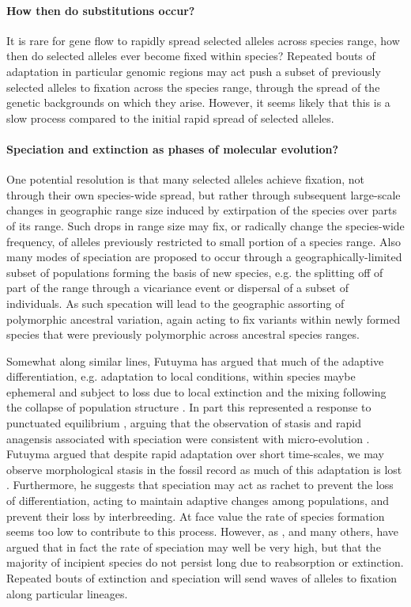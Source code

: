\documentclass{article}
\begin{document}
\paragraph{How then do substitutions occur?}
It is rare for gene flow to rapidly spread selected alleles across
species range, how then do selected alleles ever become fixed within
species? Repeated bouts of adaptation in particular genomic regions may act 
push a subset of previously selected alleles to fixation across the
species range, through the spread of the genetic backgrounds on which they arise.  
However, it seems likely that this is a slow process compared to the
initial rapid spread of selected alleles.

\paragraph{Speciation and extinction as phases of molecular evolution?}
One potential resolution is that many selected alleles achieve
fixation, not through their own species-wide spread, but rather
through subsequent large-scale changes in geographic range size
induced by extirpation of the species over parts of its range. Such drops in range size may fix, or radically change the
species-wide frequency, of alleles previously restricted to small portion of a species range. 
Also many modes of speciation are proposed to occur through a
geographically-limited subset of populations forming the basis of new species, e.g. the splitting off
of part of the range through a vicariance event or dispersal of a
subset of individuals. As such specation will lead to the geographic assorting of
polymorphic ancestral variation, again acting to fix variants within
newly formed species that were previously polymorphic across ancestral species ranges. 

Somewhat along similar lines, Futuyma has argued that much of the adaptive differentiation,
e.g. adaptation to local conditions, within species maybe ephemeral and
subject to loss due to local extinction and the mixing following the collapse of population
structure \citep{Futuyma:10,FUTUYMA:87}. In part this represented a
response to punctuated equilibrium \citep{eldredgegould72}, arguing
that the observation of stasis and rapid anagensis associated with
speciation were consistent with micro-evolution . 
Futuyma argued that despite rapid adaptation over short time-scales, we
may observe morphological stasis in the
fossil record as
much of this adaptation is lost \citep[see
also][]{Eldredge:05}. Furthermore, he suggests that speciation
may act as rachet to prevent the loss of differentiation, acting to
maintain adaptive changes among populations, and prevent their loss by
interbreeding. At face value the rate of species formation seems too low to
contribute to this process. However, as \citep{Rosenblum:12}, and many
others, have argued that in fact the rate of speciation may well be very high,
but that the majority of incipient species do not persist long due to
reabsorption or extinction. Repeated bouts of extinction and
speciation will send waves of alleles
to fixation along particular lineages. 
\end{document}
